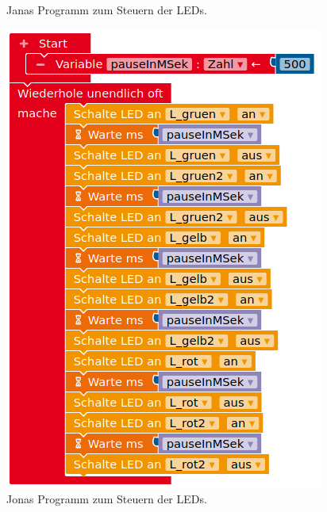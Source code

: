 \begin{figure}[H]
\begin{minipage}{0.48\textwidth}
		\caption{Janas Programm zum Steuern der LEDs.}
	\end{minipage}
	\hfill
	\begin{minipage}{0.48\textwidth}
		\centering
		\includegraphics[width=\textwidth]{./pics/lauflicht-mit-variable.png}
		\caption{Jonas Programm zum Steuern der LEDs.}
	\end{minipage}
\end{figure}

